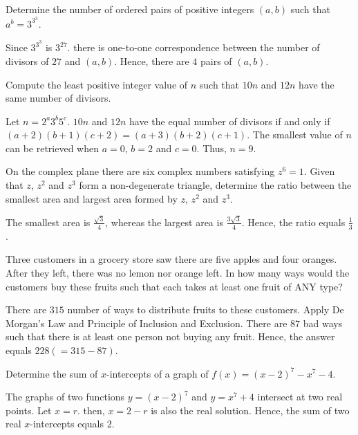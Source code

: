 \begin{problem}
Determine the number of ordered pairs of positive integers $(a,b)$ such that $a^b=3^{3^3}$.
\end{problem}

\begin{solution}
Since $3^{3^3}$ is $3^{27}$. there is one-to-one correspondence between the number of divisors of $27$ and $(a,b)$. Hence, there are $4$ pairs of $(a,b)$.
\end{solution}

\begin{problem}
Compute the least positive integer value of $n$ such that $10n$ and $12n$ have the same number of divisors.
\end{problem}

\begin{solution}
Let $n=2^a3^b5^c$. $10n$ and $12n$ have the equal number of divisors if and only if $(a+2)(b+1)(c+2)=(a+3)(b+2)(c+1)$. The smallest value of $n$ can be retrieved when $a=0$, $b=2$ and $c=0$. Thus, $n=9$.
\end{solution}

\begin{problem}
On the complex plane there are six complex numbers satisfying $z^6=1$. Given that $z$, $z^2$ and $z^3$ form a non-degenerate triangle, determine the ratio between the smallest area and largest area formed by $z$, $z^2$ and $z^3$.
\end{problem}

\begin{solution}
The smallest area is $\frac{\sqrt{3}}{4}$, whereas the largest area is $\frac{3\sqrt{3}}{4}$. Hence, the ratio equals $\frac{1}{3}$.
\end{solution}

\begin{problem}
Three customers in a grocery store saw there are five apples and four oranges. After they left, there was no lemon nor orange left. In how many ways would the customers buy these fruits such that each takes at least one fruit of ANY type?
\end{problem}

\begin{solution}
There are $315$ number of ways to distribute fruits to these customers. Apply De Morgan's Law and Principle of Inclusion and Exclusion. There are $87$ bad ways such that there is at least one person not buying any fruit. Hence, the answer equals $228(=315-87)$.
\end{solution}

\begin{problem}
Determine the sum of $x$-intercepts of a graph of $f(x)=(x-2)^7-x^7-4$.
\end{problem}

\begin{solution}
The graphs of two functions $y=(x-2)^7$ and $y=x^7+4$ intersect at two real points. Let $x=r$. then, $x=2-r$ is also the real solution. Hence, the sum of two real $x$-intercepts equals $2$. 
\end{solution}

